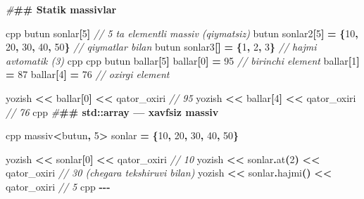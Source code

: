 \documentclass[a4paper,11pt,twoside,openright]{book}
\newenvironment{Shaded}{\begin{snugshade}}{\end{snugshade}}
\newcommand{\CommentTok}[1]{\textcolor[rgb]{0.56,0.35,0.01}{\textit{#1}}}
\newcommand{\DecValTok}[1]{\textcolor[rgb]{0.00,0.00,0.81}{#1}}
\newcommand{\ErrorTok}[1]{\textcolor[rgb]{0.64,0.00,0.00}{\textbf{#1}}}
\newcommand{\NormalTok}[1]{#1}
\newcommand{\OperatorTok}[1]{\textcolor[rgb]{0.81,0.36,0.00}{\textbf{#1}}}
\newcommand{\PreprocessorTok}[1]{\textcolor[rgb]{0.56,0.35,0.01}{\textit{#1}}}
\begin{document}
\begin{Shaded}
\begin{Highlighting}[]
\PreprocessorTok{\#}\ErrorTok{\#\# Statik massivlar}

\ErrorTok{\textasciigrave{}\textasciigrave{}\textasciigrave{}}\NormalTok{cpp}
\NormalTok{butun sonlar}\OperatorTok{[}\DecValTok{5}\OperatorTok{]}              \CommentTok{// 5 ta elementli massiv (qiymatsiz)}
\NormalTok{butun sonlar2}\OperatorTok{[}\DecValTok{5}\OperatorTok{]} \OperatorTok{=} \OperatorTok{\{}\DecValTok{10}\OperatorTok{,} \DecValTok{20}\OperatorTok{,} \DecValTok{30}\OperatorTok{,} \DecValTok{40}\OperatorTok{,} \DecValTok{50}\OperatorTok{\}}   \CommentTok{// qiymatlar bilan}
\NormalTok{butun sonlar3}\OperatorTok{[]} \OperatorTok{=} \OperatorTok{\{}\DecValTok{1}\OperatorTok{,} \DecValTok{2}\OperatorTok{,} \DecValTok{3}\OperatorTok{\}}               \CommentTok{// hajmi avtomatik (3)}
\ErrorTok{\textasciigrave{}\textasciigrave{}\textasciigrave{}}\NormalTok{cpp}
\ErrorTok{\textasciigrave{}\textasciigrave{}\textasciigrave{}}\NormalTok{cpp}
\NormalTok{butun ballar}\OperatorTok{[}\DecValTok{5}\OperatorTok{]}
\NormalTok{ballar}\OperatorTok{[}\DecValTok{0}\OperatorTok{]} \OperatorTok{=} \DecValTok{95}     \CommentTok{// birinchi element}
\NormalTok{ballar}\OperatorTok{[}\DecValTok{1}\OperatorTok{]} \OperatorTok{=} \DecValTok{87}
\NormalTok{ballar}\OperatorTok{[}\DecValTok{4}\OperatorTok{]} \OperatorTok{=} \DecValTok{76}     \CommentTok{// oxirgi element}

\NormalTok{yozish }\OperatorTok{\textless{}\textless{}}\NormalTok{ ballar}\OperatorTok{[}\DecValTok{0}\OperatorTok{]} \OperatorTok{\textless{}\textless{}}\NormalTok{ qator\_oxiri   }\CommentTok{// 95}
\NormalTok{yozish }\OperatorTok{\textless{}\textless{}}\NormalTok{ ballar}\OperatorTok{[}\DecValTok{4}\OperatorTok{]} \OperatorTok{\textless{}\textless{}}\NormalTok{ qator\_oxiri   }\CommentTok{// 76}
\ErrorTok{\textasciigrave{}\textasciigrave{}\textasciigrave{}}\NormalTok{cpp}
\PreprocessorTok{\#}\ErrorTok{\#\# \textasciigrave{}std::array\textasciigrave{} — xavfsiz massiv}

\ErrorTok{\textasciigrave{}\textasciigrave{}\textasciigrave{}}\NormalTok{cpp}
\NormalTok{massiv}\OperatorTok{\textless{}}\NormalTok{butun}\OperatorTok{,} \DecValTok{5}\OperatorTok{\textgreater{}}\NormalTok{ sonlar }\OperatorTok{=} \OperatorTok{\{}\DecValTok{10}\OperatorTok{,} \DecValTok{20}\OperatorTok{,} \DecValTok{30}\OperatorTok{,} \DecValTok{40}\OperatorTok{,} \DecValTok{50}\OperatorTok{\}}

\NormalTok{yozish }\OperatorTok{\textless{}\textless{}}\NormalTok{ sonlar}\OperatorTok{[}\DecValTok{0}\OperatorTok{]} \OperatorTok{\textless{}\textless{}}\NormalTok{ qator\_oxiri        }\CommentTok{// 10}
\NormalTok{yozish }\OperatorTok{\textless{}\textless{}}\NormalTok{ sonlar}\OperatorTok{.}\NormalTok{at}\OperatorTok{(}\DecValTok{2}\OperatorTok{)} \OperatorTok{\textless{}\textless{}}\NormalTok{ qator\_oxiri     }\CommentTok{// 30 (chegara tekshiruvi bilan)}
\NormalTok{yozish }\OperatorTok{\textless{}\textless{}}\NormalTok{ sonlar}\OperatorTok{.}\NormalTok{hajmi}\OperatorTok{()} \OperatorTok{\textless{}\textless{}}\NormalTok{ qator\_oxiri   }\CommentTok{// 5}
\ErrorTok{\textasciigrave{}\textasciigrave{}\textasciigrave{}}\NormalTok{cpp}
\OperatorTok{{-}{-}{-}}


\end{Highlighting}
\end{Shaded}
\end{document}
